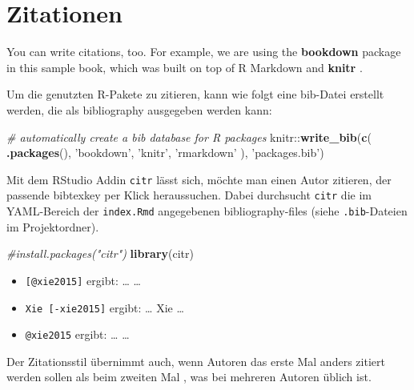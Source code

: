 \documentclass[]{book}
\makeatletter
\newenvironment{Shaded}{\begin{snugshade}}{\end{snugshade}}
\newcommand{\KeywordTok}[1]{\textcolor[rgb]{0.13,0.29,0.53}{\textbf{{#1}}}}
\newcommand{\StringTok}[1]{\textcolor[rgb]{0.31,0.60,0.02}{{#1}}}
\newcommand{\CommentTok}[1]{\textcolor[rgb]{0.56,0.35,0.01}{\textit{{#1}}}}
\newcommand{\NormalTok}[1]{{#1}}
\providecommand{\tightlist}{%
  \setlength{\itemsep}{0pt}\setlength{\parskip}{0pt}}
\newenvironment{kframe}{%
\medskip{}
\setlength{\fboxsep}{.8em}
 \def\at@end@of@kframe{}%
 \ifinner\ifhmode%
  \def\at@end@of@kframe{\end{minipage}}%
  \begin{minipage}{\columnwidth}%
 \fi\fi%
 \def\FrameCommand##1{\hskip\@totalleftmargin \hskip-\fboxsep
 \colorbox{shadecolor}{##1}\hskip-\fboxsep
     \hskip-\linewidth \hskip-\@totalleftmargin \hskip\columnwidth}%
 \MakeFramed {\advance\hsize-\width
   \@totalleftmargin\z@ \linewidth\hsize
   \@setminipage}}%
 {\par\unskip\endMakeFramed%
 \at@end@of@kframe}
\renewenvironment{Shaded}{\begin{kframe}}{\end{kframe}}
\theoremstyle{definition}
\theoremstyle{definition}
\theoremstyle{remark}
\makeatother
\begin{document}
\section{Zitationen}\label{zitationen}

You can write citations, too. For example, we are using the
\textbf{bookdown} package \citep{R-bookdown} in this sample book, which
was built on top of R Markdown and \textbf{knitr} \citep{xie2015}.

Um die genutzten R-Pakete zu zitieren, kann wie folgt eine bib-Datei
erstellt werden, die als bibliography ausgegeben werden kann:

\begin{Shaded}
\begin{Highlighting}[]
\CommentTok{# automatically create a bib database for R packages}
\NormalTok{knitr::}\KeywordTok{write_bib}\NormalTok{(}\KeywordTok{c}\NormalTok{(}
  \KeywordTok{.packages}\NormalTok{(), }\StringTok{'bookdown'}\NormalTok{, }\StringTok{'knitr'}\NormalTok{, }\StringTok{'rmarkdown'}
\NormalTok{), }\StringTok{'packages.bib'}\NormalTok{)}
\end{Highlighting}
\end{Shaded}

Mit dem RStudio Addin \texttt{citr} lässt sich, möchte man einen Autor
zitieren, der passende bibtexkey per Klick heraussuchen. Dabei
durchsucht \texttt{citr} die im YAML-Bereich der \texttt{index.Rmd}
angegebenen bibliography-files (siehe \texttt{.bib}-Dateien im
Projektordner).

\begin{Shaded}
\begin{Highlighting}[]
\CommentTok{#install.packages("citr")}
\KeywordTok{library}\NormalTok{(citr)}
\end{Highlighting}
\end{Shaded}

\begin{itemize}
\tightlist
\item
  \texttt{{[}@xie2015{]}} ergibt: \ldots{} \citep{xie2015} \ldots{}
\item
  \texttt{Xie\ {[}-xie2015{]}} ergibt: \ldots{} Xie
  \citeyearpar{xie2015} \ldots{}
\item
  \texttt{@xie2015} ergibt: \ldots{} \citet{xie2015} \ldots{}
\end{itemize}

Der Zitationsstil übernimmt auch, wenn Autoren das erste Mal anders
zitiert werden sollen \citep{Cole2012} als beim zweiten Mal
\citep{Cole2012}, was bei mehreren Autoren üblich ist.
\end{document}
